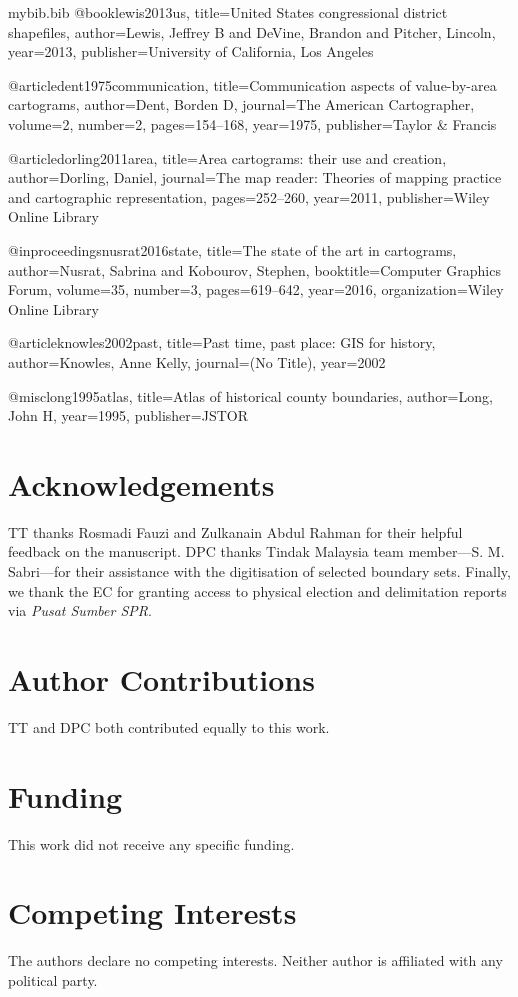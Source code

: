 \documentclass[11pt]{article}
\begin{document}
\begin{filecontents*}[overwrite]{mybib.bib}
	@book{lewis2013us,
		title={{United States} congressional district shapefiles},
		author={Lewis, Jeffrey B and DeVine, Brandon and Pitcher, Lincoln},
		year={2013},
		publisher={University of California, Los Angeles}
	}

	@article{dent1975communication,
		title={Communication aspects of value-by-area cartograms},
		author={Dent, Borden D},
		journal={The American Cartographer},
		volume={2},
		number={2},
		pages={154--168},
		year={1975},
		publisher={Taylor \& Francis}
	}

	@article{dorling2011area,
		title={Area cartograms: their use and creation},
		author={Dorling, Daniel},
		journal={The map reader: Theories of mapping practice and cartographic representation},
		pages={252--260},
		year={2011},
		publisher={Wiley Online Library}
	}

	@inproceedings{nusrat2016state,
		title={The state of the art in cartograms},
		author={Nusrat, Sabrina and Kobourov, Stephen},
		booktitle={Computer Graphics Forum},
		volume={35},
		number={3},
		pages={619--642},
		year={2016},
		organization={Wiley Online Library}
	}

	@article{knowles2002past,
		title={Past time, past place: GIS for history},
		author={Knowles, Anne Kelly},
		journal={(No Title)},
		year={2002}
	}

	@misc{long1995atlas,
		title={Atlas of historical county boundaries},
		author={Long, John H},
		year={1995},
		publisher={JSTOR}
	}


\end{filecontents*}

\begingroup
\raggedright
\linespread{1.1}
\small
\let\oldthebibliography\thebibliography

\endgroup

\section*{Acknowledgements}
TT thanks Rosmadi Fauzi and Zulkanain Abdul Rahman for their helpful feedback on the manuscript. DPC thanks Tindak Malaysia team member---S. M. Sabri---for their assistance with the digitisation of selected boundary sets. Finally, we thank the EC for granting access to physical election and delimitation reports via \textit{Pusat Sumber SPR}.

\section*{Author Contributions}
TT and DPC both contributed equally to this work.

\section*{Funding}

This work did not receive any specific funding.

\section*{Competing Interests}
The authors declare no competing interests. Neither author is affiliated with any political party.
\end{document}
